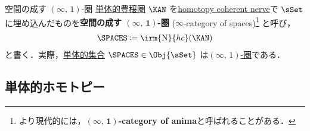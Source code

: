 \documentclass[TQFT_main]{subfiles}
\begin{document}
\begin{myexample}[label=def:Spaces]{空間の成す {$(\infty,\, 1)$}-圏}
    \hyperref[def:SimpCat]{単体的豊穣圏} $\KAN$ を\hyperref[def:nerve-hc]{homotopy coherent nerve}で $\sSet$ に埋め込んだものを\textbf{空間の成す $\bm{(\infty,\, 1)}$-圏} ($\infty$-category of spaces)\footnote{より現代的には，$\bm{(\infty,\, 1)}$\textbf{-category of anima}と呼ばれることがある．} と呼び，
    \begin{align}
         \SPACES \coloneqq \irm{\mathrm{N}}{hc} (\KAN)
    \end{align}
    と書く．実際，\hyperref[def:SimpSet]{単体的集合} $\SPACES \in \Obj{\sSet}$ は\hyperref[def:infinity-1]{$(\infty,\, 1)$-圏}である\cite[\href{https://kerodon.net/tag/01YY}{Tag 01YY}]{kerodon}．
\end{myexample}


\subsection{単体的ホモトピー}
\end{document}
